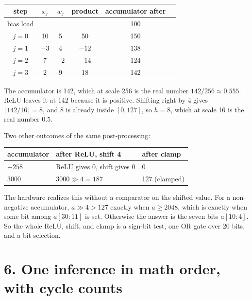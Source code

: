 \documentclass[10pt,a4paper]{article}
\begin{document}
\begin{center}
\begin{tabular}{@{}cccccc@{}}
\toprule
\textbf{step} & $x_j$ & $w_j$ & product & accumulator after \\
\midrule
bias load & & & & 100 \\
$j=0$ & 10 & 5 & 50 & 150 \\
$j=1$ & $-3$ & 4 & $-12$ & 138 \\
$j=2$ & 7 & $-2$ & $-14$ & 124 \\
$j=3$ & 2 & 9 & 18 & 142 \\
\bottomrule
\end{tabular}
\end{center}

The accumulator is 142, which at scale 256 is the real number $142/256\approx 0.555$. ReLU leaves it at 142 because it is positive. Shifting right by 4 gives $\lfloor 142/16\rfloor = 8$, and 8 is already inside $[0,127]$, so $h=8$, which at scale 16 is the real number $0.5$.

Two other outcomes of the same post-processing:
\begin{center}
\begin{tabular}{@{}lll@{}}
\toprule
\textbf{accumulator} & \textbf{after ReLU, shift 4} & \textbf{after clamp} \\
\midrule
$-258$ & ReLU gives 0, shift gives 0 & 0 \\
$3000$ & $3000\gg 4=187$ & 127 (clamped) \\
\bottomrule
\end{tabular}
\end{center}

The hardware realizes this without a comparator on the shifted value. For a non-negative accumulator, $a\gg 4>127$ exactly when $a\ge 2048$, which is exactly when some bit among $a[30:11]$ is set. Otherwise the answer is the seven bits $a[10:4]$. So the whole ReLU, shift, and clamp is a sign-bit test, one OR gate over 20 bits, and a bit selection.

\section*{6. One inference in math order, with cycle counts}
\end{document}
